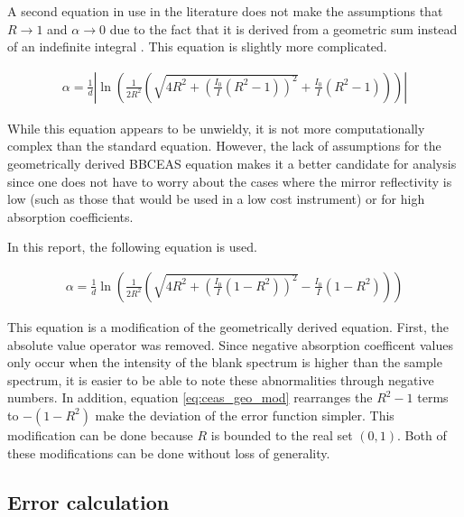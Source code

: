 A second equation in use in the literature does not make the assumptions that
$R \to 1$ and $\alpha \to 0$ due to the fact that it is derived from a
geometric sum instead of an indefinite integral \cite{Fiedler:2003db}. This
equation is slightly more complicated.

  \begin{align}
    \alpha = \frac{1}{d}\left|\ln\left(\frac{1}{2R^2}\left(\sqrt{4R^2+\left(\frac{I_0}{I}(R^2-1)\right)^2} + \frac{I_0}{I}(R^2-1)\right)\right)\right| \label{eq:ceas_geo}
  \end{align}

While this equation appears to be unwieldy, it is not more computationally
complex than the standard equation. However, the lack of assumptions for
the geometrically derived \ac{BBCEAS} equation makes it a better candidate
for analysis since one does not have to worry about the cases where the
mirror reflectivity is low (such as those that would be used in a low cost
instrument) or for high absorption coefficients.

In this report, the following equation is used. 

\begin{align}
    \alpha = \frac{1}{d}\ln\left(\frac{1}{2R^2}\left(\sqrt{4R^2+\left(\frac{I_0}{I}(1-R^2)\right)^2} - \frac{I_0}{I}(1-R^2)\right)\right) \label{eq:ceas_geo_mod}
\end{align}

This equation is a modification of the geometrically derived equation. First,
the absolute value operator was removed. Since negative absorption coefficent
values only occur when the intensity of the blank spectrum is higher than the
sample spectrum, it is easier to be able to note these abnormalities through
negative numbers. In addition, equation \eqref{eq:ceas_geo_mod} rearranges the
$R^2-1$ terms to $-(1-R^2)$ make the deviation of the error function simpler.
This modification can be done because $R$ is bounded to the real set
$(0,1)$. Both of these modifications can be done without loss of generality.



\subsection{Error calculation}\label{subsec:ceas_error}


